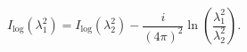\begin{equation}
I_{\log }(\lambda _{1}^{2})=I_{\log }(\lambda _{2}^{2})-\frac{i}{(4\pi )^{2}}%
\ln \left( \frac{\lambda _{1}^{2}}{\lambda _{2}^{2}}\right) .  \label{red}
\end{equation}

